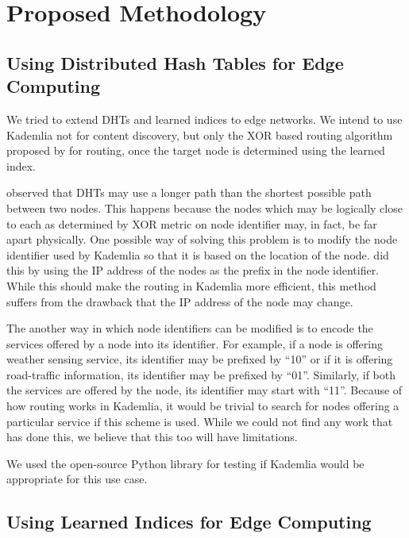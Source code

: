 \chapter{Proposed Methodology}

\section{Using Distributed Hash Tables for Edge Computing}

We tried to extend DHTs and learned indices to edge networks. We intend to use
Kademlia not for content discovery, but only the XOR based routing algorithm
proposed by \citet{petarmaymounkovKademliaPeertoPeerInformation2002} for
routing, once the target node is determined using the learned index.

\citet{xieEfficientIndexingMechanism2019} observed that DHTs may use a longer
path than the shortest possible path between two nodes. This happens because the
nodes which may be logically close to each as determined by XOR metric on node
identifier may, in fact, be far apart physically. One possible way of solving
this problem is to modify the node identifier used by Kademlia so that it is
based on the location of the node. \citet{mengweiImprovementKademliaBased2013}
did this by using the IP address of the nodes as the prefix in the node
identifier. While this should make the routing in Kademlia more efficient, this
method suffers from the drawback that the IP address of the node may change.

The another way in which node identifiers can be modified is to encode the
services offered by a node into its identifier. For example, if a node is offering
weather sensing service, its identifier may be prefixed by ``10'' or if it is
offering road-traffic information, its identifier may be prefixed by ``01''.
Similarly, if both the services are offered by the node, its identifier may
start with ``11''. Because of how routing works in Kademlia, it would be trivial
to search for nodes offering a particular service if this scheme is used. While
we could not find any work that has done this, we believe that this too will
have limitations.

We used the open-source Python library for testing if Kademlia would be
appropriate for this use case. \cite{KademliaIndexRst}

\section{Using Learned Indices for Edge Computing}

